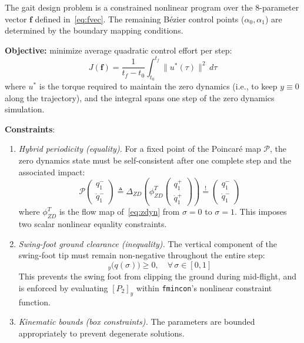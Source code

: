 \documentclass[conference]{IEEEtran}
\begin{document}
The gait design problem is a constrained nonlinear program over the 8-parameter vector $\bm{f}$ defined in~\eqref{eq:fvec}. The remaining B\'ezier control points ($\alpha_0, \alpha_1$) are determined by the boundary mapping conditions.

\textbf{Objective:} minimize average quadratic control effort per step:
\begin{equation}
    J(\bm{f}) = \frac{1}{t_f - t_0} \int_{t_0}^{t_f} \|u^*(\tau)\|^2\, d\tau \label{eq:cost}
\end{equation}
where $u^*$ is the torque required to maintain the zero dynamics (i.e., to keep $y \equiv 0$ along the trajectory), and the integral spans one step of the zero dynamics simulation.

\textbf{Constraints}:
\begin{enumerate}
    \item \emph{Hybrid periodicity (equality).} For a fixed point of the Poincar\'e map $\mathcal{P}$, the zero dynamics state must be self-consistent after one complete step and the associated impact:
    \begin{equation}
        \mathcal{P}\!\begin{pmatrix} q_1^- \\ \dot{q}_1^- \end{pmatrix}
        \triangleq \Delta_{ZD}\!\left(\phi_{ZD}^{T}\!\begin{pmatrix} q_1^+ \\ \dot{q}_1^+ \end{pmatrix}\right)
        \stackrel{!}{=}
        \begin{pmatrix} q_1^- \\ \dot{q}_1^- \end{pmatrix}
    \end{equation}
    where $\phi_{ZD}^T$ is the flow map of~\eqref{eq:zdyn} from $\sigma=0$ to $\sigma=1$. This imposes two scalar nonlinear equality constraints.

    \item \emph{Swing-foot ground clearance (inequality).} The vertical component of the swing-foot tip must remain non-negative throughout the entire step:
    \begin{equation}
        [P_2]_y\!\bigl(q(\sigma)\bigr) \geq 0, \quad \forall\, \sigma \in [0,1]
    \end{equation}
    This prevents the swing foot from clipping the ground during mid-flight, and is enforced by evaluating $[P_2]_y$ within \texttt{fmincon}'s nonlinear constraint function.

    \item \emph{Kinematic bounds (box constraints).} The parameters are bounded appropriately to prevent degenerate solutions.
\end{enumerate}
\end{document}
